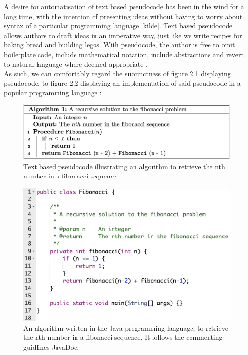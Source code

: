 A desire for automatisation of text based pseudocode has been in the wind for a long time, with the intention of presenting ideas without having to worry about syntax of a particular programming language [kilde]. Text based pseudocode allows authors to draft ideas in an imperative way, just like we write recipes for baking bread and building legos. With pseudocode, the author is free to omit boilerplate code, include mathematical notation, include abstractions and revert to natural language where deemed appropriate \cite{BOOK:intro/Cormen/Leiserson}\cite{DBLP:conf/els/Nuallain15}. \hfill \\

As such, we can comfortably regard the succinctness of figure 2.1 displaying pseudocode, to figure 2.2 displaying an implementation of said pseudocode in a popular programming language \cite{LINCOPINIS2023}:

\begin{figure}[ht]
    \centering
    \includegraphics[scale=0.46]{assets/fibonacci_pseudo1.png}
    \caption{Text based pseudocode illustrating an algorithm to retrieve the nth number in a fibonacci sequence}
    \label{fig:fibseq1}
\end{figure}

\begin{figure}[ht]
    \centering
    \includegraphics[scale=0.50]{assets/fibonacci_java.png}
    \caption[An algorithm written in the Java programming language, to retrieve the nth number in a fibonacci sequence.]{An algorithm written in the Java programming language, to retrieve the nth number in a fibonacci sequence. It follows the commenting guidlines JavaDoc\footnotemark.}
    \label{fig:fibjava}
\end{figure}


